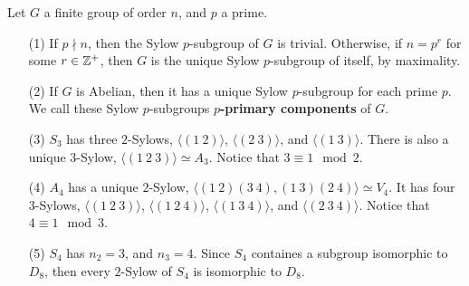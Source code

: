 \begin{example}\label{4.12}
    Let $G$ a finite group of order $n$, and  $p$ a prime.
    \begin{enumerate}
        \item[(1)] If $p \nmid n$, then the Sylow $p$-subgroup of $G$ is
            trivial. Otherwise, if  $n=p^r$ for some  $r \in \mathbb{Z}^+$, then $G$ is
            the unique Sylow $p$-subgroup of itself, by maximality.

        \item[(2)] If $G$ is Abelian, then it has a unique Sylow $p$-subgroup
            for each prime $p$. We call these Sylow $p$-subgroups
            \textbf{$p$-primary components} of $G$.

        \item[(3)] $S_3$ has three $2$-Sylows, $\langle (1 \ 2) \rangle$,
            $\langle (2 \ 3) \rangle$, and  $\langle (1 \ 3) \rangle$. There is
            also a unique $3$-Sylow,  $\langle (1 \ 2 \ 3) \rangle \simeq A_3$.
            Notice that $3 \equiv 1 \mod{2}$.

        \item[(4)] $A_4$ has a unique $2$-Sylow,  $\langle (1 \ 2)(3 \ 4),
            (1 \ 3)(2 \ 4) \rangle \simeq V_4$. It has four $3$-Sylows,
            $\langle (1 \ 2 \ 3) \rangle$, $\langle (1 \ 2 \ 4) \rangle$, $\langle
            (1 \ 3 \ 4) \rangle$, and $\langle (2 \ 3 \ 4) \rangle$. Notice that
             $4 \equiv 1 \mod{3}$.

         \item[(5)] $S_4$ has $n_2=3$, and  $n_3=4$. Since $S_4$ containes a
             subgroup isomorphic to $D_8$, then every $2$-Sylow of $S_4$ is
             isomorphic to $D_8$.
    \end{enumerate}
\end{example}
